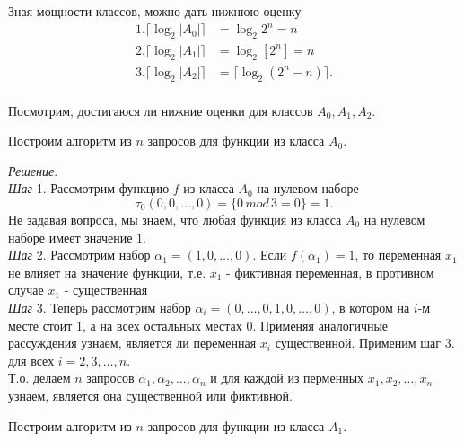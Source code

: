 \documentclass[oneside, final, 12pt]{extreport}
\begin{document}
	\noindent Зная мощности классов, можно дать нижнюю оценку 
	\begin{displaymath}
		\begin{aligned}
			1. \lceil \log_2{|A_0|} \rceil & = \log_2{2^n} = n  \\		
			2. \lceil \log_2{|A_1|} \rceil & = \log_2[2^n] = n  \\
			3. \lceil \log_2{|A_2|} \rceil & = \lceil \log_2(2^n - n) \rceil.  \\
		\end{aligned}
	\end{displaymath}
	
	\noindent Посмотрим, достигаюся ли нижние оценки для классов $A_0, A_1, A_2$. \par
	\bigskip
	\noindent Построим алгоритм из $n$ запросов  для функции из класса  $A_0$.
	
	\noindent\emph{Решение}. \\
	\emph{Шаг} 1. Рассмотрим функцию $f$  из класса $A_0$ на нулевом наборе
	 \[
	 	\tau_0(0, 0, \ldots, 0) =  \{0 \, mod \, 3 = 0\} = 1.
	 \]
	 Не задавая вопроса, мы знаем, что любая функция из класса $A_0$ на нулевом наборе имеет значение $1$.\\
	 \emph{Шаг} 2. Рассмотрим набор $\alpha_1 = (1, 0,  \ldots, 0)$. Если $f(\alpha_1) = 1$, то переменная $x_1$ не влияет на значение функции, т.е. $x_1$ - 
	 фиктивная переменная, в противном случае $x_1$ - существенная \\
	 \emph{Шаг} 3. Теперь рассмотрим набор $\alpha_i = (0, \ldots, 0,  1,  0, \ldots, 0)$, в котором на $i$-м месте стоит $1$, а на всех остальных местах $0$.
	  Применяя аналогичные рассуждения узнаем, является ли переменная $x_i$ существенной. Применим шаг 3. для всех $i = 2, 3, \ldots, n$. \\ 
	 \noindent Т.о. делаем $n$  запросов $\alpha_1, \alpha_2, \ldots, \alpha_n$ и для каждой из перменных $x_1, x_2, \ldots, x_n$ узнаем, является она существенной 
	 или фиктивной.\par
	\bigskip
	\noindent Построим алгоритм из $n$ запросов  для функции из класса  $A_1$.
	
\end{document}

